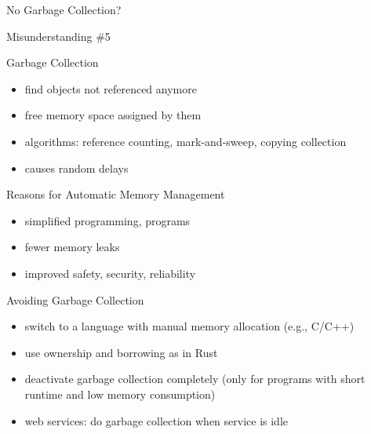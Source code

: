 \begin{frame}[b]{No Garbage Collection?}
	\vspace{-10mm}
	\begin{fancycolumns}[b]
		\begin{example}{Misunderstanding \#5}
		\end{example}
		\begin{definition}{Garbage Collection}
			\begin{itemize}
				\item find objects not referenced anymore
				\item free memory space assigned by them
				\item algorithms: reference counting, mark-and-sweep, copying collection
				\item causes random delays
			\end{itemize}
		\end{definition}
		\begin{note}{Reasons for Automatic Memory Management}
			\begin{itemize}
				\item simplified programming, programs
				\item fewer memory leaks
				\item improved safety, security, reliability
			\end{itemize}
		\end{note}
		\nextcolumn
		\hfill
		\pause
		\begin{example}{Avoiding Garbage Collection}
			\begin{itemize}
				\item switch to a language with manual memory allocation (e.g., C/C++)
				\item use ownership and borrowing as in Rust
				\item deactivate garbage collection completely (only for programs with short runtime and low memory consumption)
				\item web services: do garbage collection when service is idle
			\end{itemize}
		\end{example}
	\end{fancycolumns}
\end{frame}

